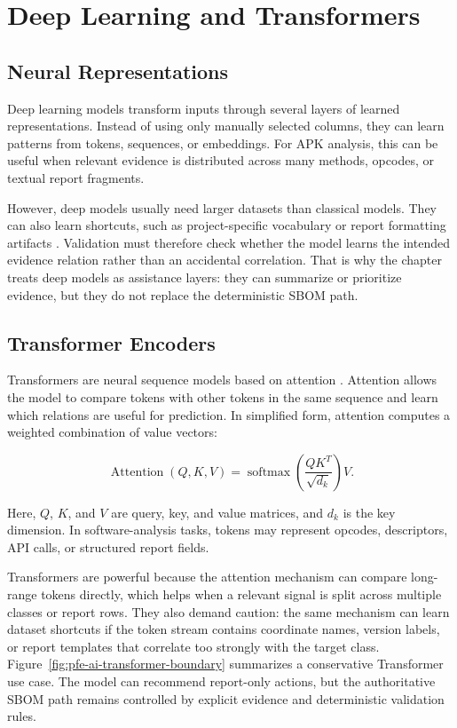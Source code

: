 \section{Deep Learning and Transformers}

\subsection{Neural Representations}

Deep learning models transform inputs through several layers of learned
representations. Instead of using only manually selected columns, they can
learn patterns from tokens, sequences, or embeddings. For APK analysis, this
can be useful when relevant evidence is distributed across many methods,
opcodes, or textual report fragments.

However, deep models usually need larger datasets than classical models. They
can also learn shortcuts, such as project-specific vocabulary or report
formatting artifacts \cite{geirhos2020shortcut}. Validation must therefore
check whether the model learns the intended evidence relation rather than an
accidental correlation. That is why the chapter treats deep models as
assistance layers: they can summarize or prioritize evidence, but they do not
replace the deterministic SBOM path.

\subsection{Transformer Encoders}

Transformers are neural sequence models based on attention
\cite{vaswani2017attention}. Attention allows the model to compare tokens
with other tokens in the same sequence and learn which relations are useful
for prediction. In simplified form, attention computes a weighted
combination of value vectors:

\begin{equation}
\label{eq:pfe-ai-attention}
\operatorname{Attention}(Q,K,V)=
\operatorname{softmax}\left(\frac{QK^{T}}{\sqrt{d_k}}\right)V.
\end{equation}

Here, \(Q\), \(K\), and \(V\) are query, key, and value matrices, and \(d_k\)
is the key dimension. In software-analysis tasks, tokens may represent
opcodes, descriptors, API calls, or structured report fields.

Transformers are powerful because the attention mechanism can compare
long-range tokens directly, which helps when a relevant signal is split across
multiple classes or report rows. They also demand caution: the same mechanism
can learn dataset shortcuts if the token stream contains coordinate names,
version labels, or report templates that correlate too strongly with the
target class. Figure~\ref{fig:pfe-ai-transformer-boundary} summarizes a
conservative Transformer use case. The model can recommend report-only
actions, but the authoritative SBOM path remains controlled by explicit
evidence and deterministic validation rules.

